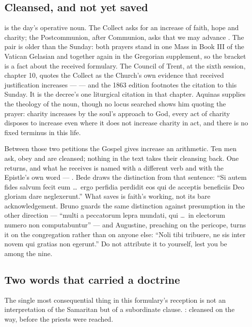 \subsection*{Cleansed, and not yet saved}

 is the day's operative noun. The Collect asks for an
increase of faith, hope and charity; the Postcommunion, after Communion, asks
that we may advance . The pair
is older than the Sunday: both prayers stand in one Mass in Book III of the
Vatican Gelasian and together again in the Gregorian supplement, so the
bracket is a fact about the received formulary. The Council of Trent, at the sixth session, chapter 10, quotes the
Collect as the Church's own evidence that received justification increases ---
 --- and the 1863 edition
footnotes the citation to this Sunday. It is the decree's one liturgical
citation in that chapter. Aquinas supplies the theology of the noun, though
no locus searched shows him quoting the prayer: charity
increases by the soul's approach to God, every act of charity disposes to
increase even where it does not increase charity in act, and there is no fixed
terminus in this life.

Between those two petitions the Gospel gives increase an arithmetic. Ten men
ask, obey and are cleansed; nothing in the text takes their cleansing back.
One returns, and what he receives is named with a different verb and with the
Epistle's own word --- . Bede draws the
distinction from that sentence: ``Si autem fides salvum fecit eum \dots\ ergo
perfidia perdidit eos qui de acceptis beneficiis Deo gloriam dare
neglexerunt.'' What saves is faith's working, not its bare acknowledgement.
Bruno guards the same distinction against presumption in the other direction
--- ``multi a peccatorum lepra mundati, qui \dots\ in electorum numero non
computabuntur'' --- and Augustine, preaching on the pericope, turns it on the
congregation rather than on anyone else: ``Noli tibi tribuere, ne sis inter
novem qui gratias non egerunt.'' Do not attribute it to yourself, lest you be
among the nine.

\subsection*{Two words that carried a doctrine}

The single most consequential thing in this formulary's reception is not an
interpretation of the Samaritan but of a subordinate clause. : cleansed on the way, before the priests were
reached.

